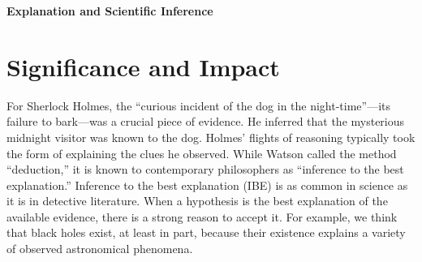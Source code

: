 \documentclass{article}[11pt]
\title{}
\author{}
\date{}
\begin{document}
\doublespacing
\setlength{\parindent}{1cm}
\normalsize

\begin{center}
	\textbf{{\Large Explanation and Scientific Inference}}
\end{center}
\tableofcontents
\clearpage
\section{Significance and Impact}

% 
%

For Sherlock Holmes, the ``curious incident of the dog in the night-time''---its failure to bark---was a crucial piece of evidence.   He inferred that the mysterious midnight visitor was known to the dog.  Holmes' flights of reasoning typically took the form of explaining the clues he observed.  While Watson called the method ``deduction,'' it is known to contemporary philosophers as ``inference to the best explanation.''  Inference to the best explanation (IBE) is as common in science as it is in detective literature.  When a hypothesis is the best explanation of the available evidence, there is a strong reason to accept it.  For example, we think that black holes exist, at least in part, because their existence explains a variety of observed astronomical phenomena.
\end{document}
